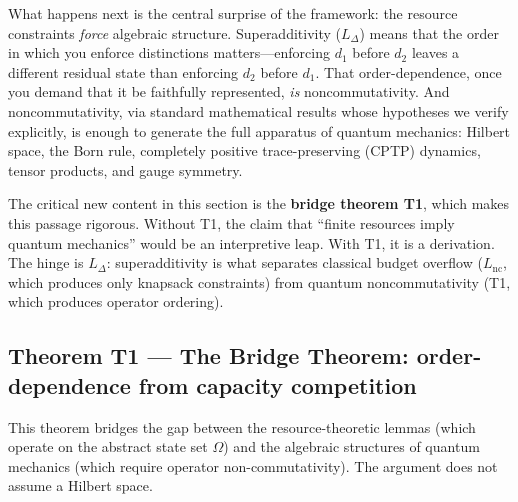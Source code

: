 \documentclass[11pt]{article}
\begin{document}
What happens next is the central surprise of the framework: the resource constraints \emph{force} algebraic structure.  Superadditivity ($L_\Delta$) means that the order in which you enforce distinctions matters---enforcing $d_1$ before $d_2$ leaves a different residual state than enforcing $d_2$ before $d_1$.  That order-dependence, once you demand that it be faithfully represented, \emph{is} noncommutativity.  And noncommutativity, via standard mathematical results whose hypotheses we verify explicitly, is enough to generate the full apparatus of quantum mechanics: Hilbert space, the Born rule, completely positive trace-preserving (CPTP) dynamics, tensor products, and gauge symmetry.

The critical new content in this section is the \textbf{bridge theorem T1}, which makes this passage rigorous.  Without T1, the claim that ``finite resources imply quantum mechanics'' would be an interpretive leap.  With T1, it is a derivation.  The hinge is $L_\Delta$: superadditivity is what separates classical budget overflow ($L_{\mathrm{nc}}$, which produces only knapsack constraints) from quantum noncommutativity (T1, which produces operator ordering).


\subsection{Theorem T1 --- The Bridge Theorem: order-dependence from capacity competition}

This theorem bridges the gap between the resource-theoretic lemmas (which operate on the abstract state set $\Omega$) and the algebraic structures of quantum mechanics (which require operator non-commutativity).  The argument does not assume a Hilbert space.
\end{document}
